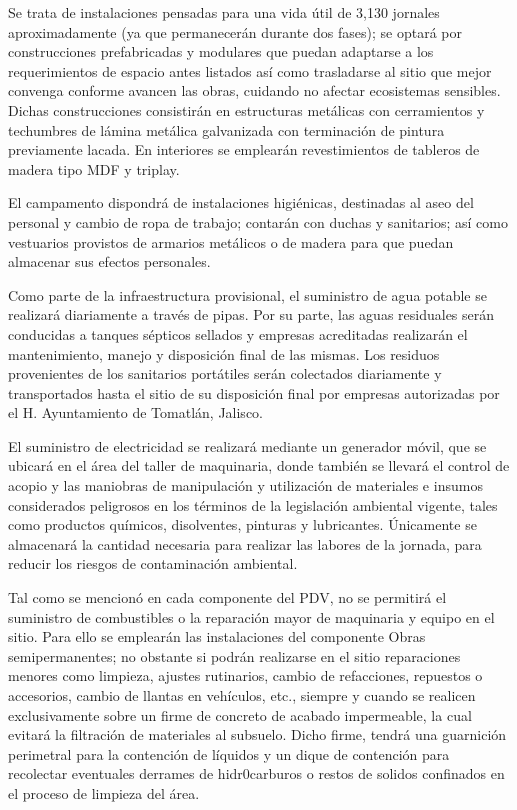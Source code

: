 \documentclass{article}
\begin{document}
\bigskip


\bigskip

Se trata de instalaciones pensadas para una vida útil de 3,130 jornales aproximadamente (ya que permanecerán durante dos fases); se optará por construcciones prefabricadas y modulares que puedan adaptarse a los requerimientos de espacio antes listados así como trasladarse al sitio que mejor convenga conforme avancen las obras, cuidando no afectar ecosistemas sensibles. Dichas construcciones consistirán en estructuras metálicas con cerramientos y techumbres de lámina metálica galvanizada con terminación de pintura previamente lacada. En interiores se emplearán revestimientos de tableros de madera tipo MDF y triplay.

El campamento dispondrá de instalaciones higiénicas, destinadas al aseo del personal y cambio de ropa de trabajo; contarán con duchas y sanitarios; así como vestuarios provistos de armarios metálicos o de madera para que puedan almacenar sus efectos personales. 

Como parte de la infraestructura provisional, el suministro de agua potable se realizará diariamente a través de pipas. Por su parte, las aguas residuales serán conducidas a tanques sépticos sellados y empresas acreditadas realizarán el mantenimiento, manejo y disposición final de las mismas. Los residuos provenientes de los sanitarios portátiles serán colectados diariamente y transportados hasta el sitio de su disposición final por empresas autorizadas por el H. Ayuntamiento de Tomatlán, Jalisco.

El suministro de electricidad se realizará mediante un generador móvil, que se ubicará en el área del taller de maquinaria, donde también se llevará el control de acopio y las maniobras de manipulación y utilización de materiales e insumos considerados peligrosos en los términos de la legislación ambiental vigente, tales como productos químicos, disolventes, pinturas y lubricantes. Únicamente se almacenará la cantidad necesaria para realizar las labores de la jornada, para reducir los riesgos de contaminación ambiental.

Tal como se mencionó en cada componente del PDV, no se permitirá el suministro de combustibles o la reparación mayor de maquinaria y equipo en el sitio. Para ello se emplearán las instalaciones del componente Obras semipermanentes; no obstante si podrán realizarse en el sitio reparaciones menores como limpieza, ajustes rutinarios, cambio de refacciones, repuestos o accesorios, cambio de llantas en vehículos, etc., siempre y cuando se realicen exclusivamente sobre un firme de concreto de acabado impermeable, la cual evitará la filtración de materiales al subsuelo. Dicho firme, tendrá una guarnición perimetral para la contención de líquidos y un dique de contención para recolectar eventuales derrames de hidr0carburos o restos de solidos confinados en el proceso de limpieza del área.
\end{document}
